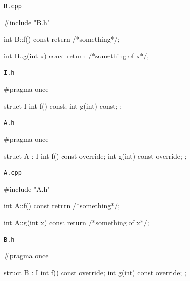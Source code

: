 \newsavebox\classBcpp
\begin{lrbox}{\classBcpp}%
\begin{minipage}[\baselineskip]{\codewidth}
\texttt{B.cpp}
\begin{cppcode}[numbers = none]
#include "B.h"

int B::f() const {
  return /*something*/;
}

int B::g(int x) const {
  return /*something of x*/;
}
\end{cppcode}
\end{minipage}%
\end{lrbox}

\newsavebox\classIh
\begin{lrbox}{\classIh}%
\begin{minipage}[\baselineskip]{\codewidth}
\texttt{I.h}
\begin{cppcode}[numbers = none]
#pragma once

struct I {
  int f() const;
  int g(int) const;
};
\end{cppcode}
\end{minipage}%
\end{lrbox}

\newsavebox\classAIh
\begin{lrbox}{\classAIh}%
\begin{minipage}[\baselineskip]{\codewidth}
\texttt{A.h}
\begin{cppcode}[numbers = none]
#pragma once

struct A : I {
  int f() const override;
  int g(int) const override;
};
\end{cppcode}
\end{minipage}%
\end{lrbox}

\newsavebox\classAIcpp
\begin{lrbox}{\classAIcpp}%
\begin{minipage}[\baselineskip]{\codewidth}
\texttt{A.cpp}
\begin{cppcode}[numbers = none]
#include "A.h"

int A::f() const {
  return /*something*/;
}

int A::g(int x) const {
  return /*something of x*/;
}
\end{cppcode}
\end{minipage}%
\end{lrbox}

\newsavebox\classBIh
\begin{lrbox}{\classBIh}%
\begin{minipage}[\baselineskip]{\codewidth}
\texttt{B.h}
\begin{cppcode}[numbers = none]
#pragma once

struct B : I {
  int f() const override;
  int g(int) const override;
};
\end{cppcode}
\end{minipage}%
\end{lrbox}

